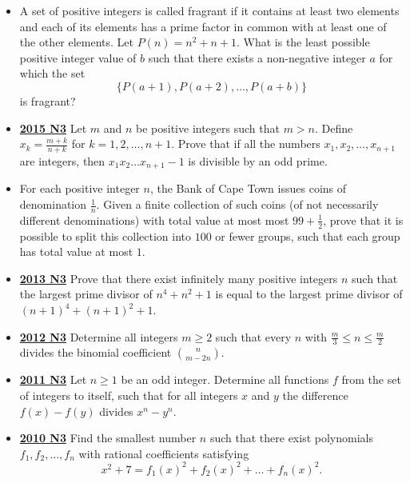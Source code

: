 \documentclass[11pt]{scrartcl}
\begin{document}
\begin{itemize}[leftmargin=*]
\item {} A set of positive integers is called fragrant if it contains at least two elements and each of its elements has a prime factor in common with at least one of the other elements. Let $P(n)=n^2+n+1$. What is the least possible positive integer value of $b$ such that there exists a non-negative integer $a$ for which the set$$\{P(a+1),P(a+2),\dots,P(a+b)\}$$is fragrant?
\item \href{https://artofproblemsolving.com/community/c6h1268874p6622379}{\textbf{2015 N3}} Let $m$ and $n$ be positive integers such that $m>n$. Define $x_k=\frac{m+k}{n+k}$ for $k=1,2,\dots,n+1$. Prove that if all the numbers $x_1,x_2,\dots,x_{n+1}$ are integers, then $x_1x_2\dots x_{n+1}-1$ is divisible by an odd prime.
\item {} For each positive integer $n$, the Bank of Cape Town issues coins of denomination $\frac1n$. Given a finite collection of such coins (of not necessarily different denominations) with total value at most most $99+\frac12$, prove that it is possible to split this collection into $100$ or fewer groups, such that each group has total value at most $1$.
\item \href{https://artofproblemsolving.com/community/c6h597245p3544101}{\textbf{2013 N3}} Prove that there exist infinitely many positive integers $n$ such that the largest prime divisor of $n^4 + n^2 + 1$ is equal to the largest prime divisor of $(n+1)^4 + (n+1)^2 +1$.
\item \href{https://artofproblemsolving.com/community/c6h545764p3156840}{\textbf{2012 N3}} Determine all integers $m \geqslant  2$ such that every $n$ with $\frac{m}{3} \leqslant n \leqslant \frac{m}{2}$ divides the binomial coefficient $\binom{n}{m-2n}$.
\item \href{https://artofproblemsolving.com/community/c6h488541p2737651}{\textbf{2011 N3}} 	Let $n \geqslant  1$ be an odd integer. Determine all functions $f$ from the set of integers to itself, such that for all integers $x$ and $y$ the difference $f(x)-f(y)$ divides $x^n-y^n.$
\item \href{https://artofproblemsolving.com/community/c6h418641p2362006}{\textbf{2010 N3}} 	Find the smallest number $n$ such that there exist polynomials $f_1, f_2, \dots , f_n$ with rational coefficients satisfying\[x^2+7 = f_1\left(x\right)^2 + f_2\left(x\right)^2 + \dots + f_n\left(x\right)^2.\]

\end{itemize}
\end{document}
